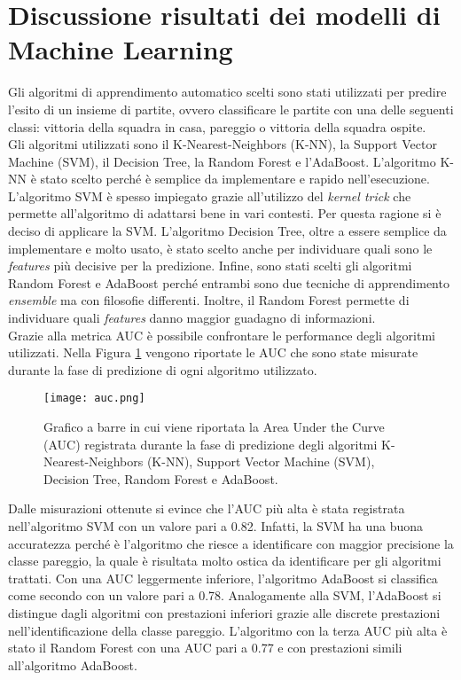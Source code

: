 \section{Discussione risultati dei modelli di Machine Learning}
Gli algoritmi di apprendimento automatico scelti sono stati utilizzati per predire l'esito di un insieme di partite, ovvero classificare le partite con una delle seguenti classi: vittoria della squadra in casa, pareggio o vittoria della squadra ospite.\\
Gli algoritmi utilizzati sono il K-Nearest-Neighbors (K-NN), la Support Vector Machine (SVM), il Decision Tree, la Random Forest e l'AdaBoost. L'algoritmo K-NN è stato scelto perché è semplice da implementare e rapido nell'esecuzione. L'algoritmo SVM è spesso impiegato grazie all'utilizzo del \emph{kernel trick} che permette all'algoritmo di adattarsi bene in vari contesti. Per questa ragione si è deciso di applicare la SVM. L'algoritmo Decision Tree, oltre a essere semplice da implementare e molto usato, è stato scelto anche per individuare quali sono le \emph{features} più decisive per la predizione. Infine, sono stati scelti gli algoritmi Random Forest e AdaBoost perché entrambi sono due tecniche di apprendimento \emph{ensemble} ma con filosofie differenti. Inoltre, il Random Forest permette di individuare quali \emph{features} danno maggior guadagno di informazioni.\\
Grazie alla metrica AUC è possibile confrontare le performance degli algoritmi utilizzati. Nella Figura \ref{fig:auc} vengono riportate le AUC che sono state misurate durante la fase di predizione di ogni algoritmo utilizzato.
\begin{figure}[h]
	\begin{center}
		\texttt{[image: auc.png]}
		\caption{Grafico a barre in cui viene riportata la Area Under the Curve (AUC) registrata durante la fase di predizione degli algoritmi K-Nearest-Neighbors (K-NN), Support Vector Machine (SVM), Decision Tree, Random Forest e AdaBoost.  
		} 
		\label{fig:auc}
	\end{center}
\end{figure}
Dalle misurazioni ottenute si evince che l'AUC più alta è stata registrata nell'algoritmo SVM con un valore pari a 0.82. Infatti, la SVM ha una buona accuratezza perché è l'algoritmo che riesce a identificare con maggior precisione la classe pareggio, la quale è risultata molto ostica da identificare per gli algoritmi trattati. Con una AUC leggermente inferiore, l'algoritmo AdaBoost si classifica come secondo con un valore pari a 0.78. Analogamente alla SVM, l'AdaBoost si distingue dagli algoritmi con prestazioni inferiori grazie alle discrete prestazioni nell'identificazione della classe pareggio. L'algoritmo con la terza AUC più alta è stato il Random Forest con una AUC pari a 0.77 e con prestazioni simili all'algoritmo AdaBoost.
